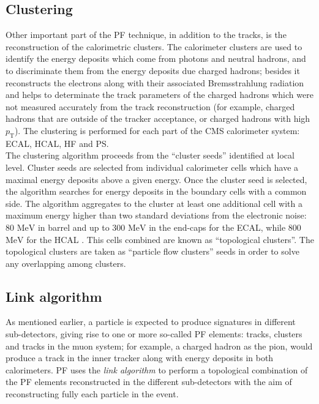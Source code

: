 \subsection{Clustering}
\label{subsec:Clustering}
Other important part of the PF technique, in addition to the tracks, is the reconstruction of the 
calorimetric clusters. The calorimeter clusters are used to identify the energy deposits which come from 
photons and neutral hadrons, and to discriminate them from the energy deposits due charged hadrons; 
besides it reconstructs the electrons along with their associated Bremsstrahlung radiation
and helps to determinate the track parameters of the charged hadrons which were not measured 
accurately from the track reconstruction (for example, charged hadrons that are outside of the tracker acceptance, or 
charged hadrons with high $p_{\textrm{T}}$). The clustering is performed for 
each part of the CMS calorimeter system: ECAL, HCAL, HF and PS.\\

The clustering algorithm proceeds from the ``cluster seeds'' identified at local level. Cluster seeds are selected 
from individual calorimeter cells which have a maximal energy deposits above a given energy. Once the cluster seed is selected,
the algorithm searches for energy deposits in the  boundary cells with a common side. The algorithm aggregates to the cluster 
at least one additional cell with a maximum energy higher than two standard deviations from the electronic noise: 80 $\textrm{MeV}$ in 
barrel and up to 300 $\textrm{MeV}$ in the end-caps for the ECAL, while 800 $\textrm{MeV}$ for the HCAL \cite{CMS-PAS-PFT-09-001}. This
cells combined are known as ``topological clusters''. The topological clusters are taken as ``particle flow clusters'' seeds
in order to solve any overlapping among clusters.

\subsection{Link algorithm}
\label{subsec:Linkalgorithm}
As mentioned earlier, a particle is expected to produce signatures in different sub-detectors, giving rise to one or more 
so-called PF elements: tracks, clusters and tracks in the muon system; for example, 
a charged hadron as the pion, would produce a track in the inner tracker along with 
energy deposits in both calorimeters. PF uses the \textit{link algorithm} to perform a topological combination 
of the PF elements reconstructed in the different sub-detectors with the aim of reconstructing fully each particle in the event. \\


